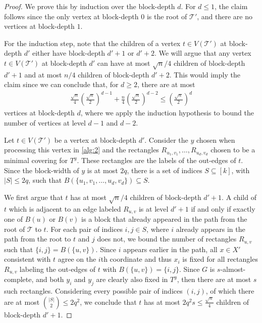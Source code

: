 \documentclass[10pt,a4paper]{article}
\theoremstyle{definition}
\theoremstyle{remark}
\theoremstyle{example}
\theoremstyle{plain}
\newcommand{\calT}{\mathcal{T}}
\newcommand{\threshold}{q}
\newcommand{\ndense}{almost-complete\xspace}
\begin{document}
{}{
\begin{proof}
    We prove this by induction over the block-depth $d$. For $d \leq 1$, the claim follows since the only vertex at block-depth $0$ is the root of $\calT '$, and there are no vertices at block-depth $1$.

    For the induction step, 
    note that the children of a vertex $t \in V(\calT')$ at block-depth $d'$ either have block-depth $d' + 1$ or $d' +2$. We will argue that any vertex $t \in V(\calT')$ at block-depth $d'$ can have at most $\sqrt{n}/4$ children of 
    block-depth $d' + 1$ and at most $n/4$ children of block-depth $d' + 2$. 
    This would imply the claim since
    we can conclude that, for $d \geq 2$, there are at most
    \begin{align*}
       \frac{\sqrt{n}}{4}\left(\frac{\sqrt{n}}{2}\right)^{d-1}
        +
       \frac{n}{4}\left(\frac{\sqrt{n}}{2}\right)^{d-2}
       \leq\left(\frac{\sqrt{n}}{2}\right)^d 
    \end{align*}
    vertices at block-depth $d$, where we apply the induction hypothesis to bound the number of vertices at level $d -1$ and $d -2$.

    Let $t \in V(\calT')$ be a vertex at block-depth $d'$. Consider the $y$ chosen when processing this vertex in \autoref{alg:2} and the rectangles $R_{u_1,v_1},\dots,R_{u_d,v_d}$ chosen to be a minimal covering for $T^y$. These rectangles are the labels of the out-edges of $t$. Since the block-width of $y$ is at most $2\threshold$, there is a set of indices $S\subseteq [k]$, with $\lvert S\rvert \leq 2\threshold$, such that $B(\{u_1,v_1,\ldots,u_{d},v_{d}\})\subseteq S$.
    
    We first argue that $t$ has at most $\sqrt{n}/4$ children of 
    block-depth $d' + 1$. 
    A child of $t$ which is adjacent to an edge labeled $R_{u,v}$ is at level $d' + 1$ if and only if exactly one of $B(u)$ or $B(v)$ is a block that already appeared in the path from the root of $\calT$ to $t$. 
    For each pair of indices $i,j \in S$, where $i$ already appears in the path from the root to $t$ and $j$ does not, we bound the number of rectangles $R_{u,v}$ such that $\{i,j\} = B(\{u,v\})$.
    Since $i$ appears earlier in the path, all $x \in X'$ consistent with $t$ agree on the $i$th coordinate and thus $x_i$ is fixed for all rectangles $R_{u,v}$ labeling the out-edges of $t$ with $ B(\{u,v\}) = \{i,j\}$. Since $G$ is $s$-\ndense, and both $y_i$ and $y_j$ are clearly also fixed in $T^y$, then there are at most 
    $s$ 
    such rectangles. 
    Considering every possible pair of indices $(i,j)$, of which there are at most $\binom{|S| }{ 2} \leq 2\threshold^2$, we conclude that $t$ has at most $2\threshold^2 s\leq \frac{\sqrt{n}}{4}$ children of 
    block-depth $d' + 1$. 
    


\end{proof}}
\end{document}
